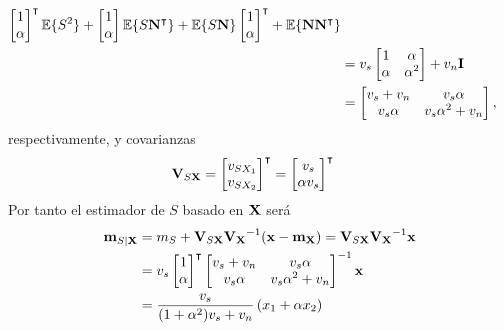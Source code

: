 \begin{solution}
\begin{parts}
\begin{align*}
	   \begin{bmatrix} 1 \\ \alpha \end{bmatrix}^\intercal \mathbb{E}\{S^2\} 
	 + \begin{bmatrix} 1 \\ \alpha \end{bmatrix} \mathbb{E}\{S {\bf N} ^\intercal \}  
	 + \mathbb{E}\{S {\bf N}\}  \begin{bmatrix} 1 \\ \alpha \end{bmatrix}^\intercal 
	 + \mathbb{E}\{{\bf N} {\bf N} ^\intercal \}  \\
	&= v_s \begin{bmatrix} 1 & \alpha \\ \alpha & \alpha^2 \end{bmatrix} + v_n {\bf I}  \\ 
	&= \begin{bmatrix} v_s + v_n & v_s \alpha \\ v_s \alpha & v_s \alpha^2 + v_n \end{bmatrix},
\end{align*}
respectivamente, y covarianzas
\begin{align*}
{\bf V}_{S{\bf X}}  
	&= \begin{bmatrix} v_{SX_1} \\ v_{SX_2} \end{bmatrix}^\intercal
	 = \begin{bmatrix} v_s \\ \alpha v_s \end{bmatrix}^\intercal
\end{align*}
Por tanto el estimador de $S$ basado en ${\bf X}$ será
\begin{align*}
{\bf m}_{S |{\bf X}} 
      &= m_S + {\bf V}_{S {\bf X}}{\bf V_X}^{-1}({\bf x}-{\bf m}_{\bf X})  
       = {\bf V}_{S {\bf X}}{\bf V_X}^{-1}{\bf x}  \\ 
      &= v_s \begin{bmatrix} 1 \\ \alpha \end{bmatrix}^\intercal  
         \begin{bmatrix} v_s + v_n & v_s \alpha \\ v_s \alpha & v_s \alpha^2 + v_n \end{bmatrix}^{-1}{\bf x}  \\ 
      &= \frac{v_s}{(1 + \alpha^2)v_s + v_n} \left( x_1 + \alpha x_2\right)
\end{align*}
\end{parts}
\end{solution}

